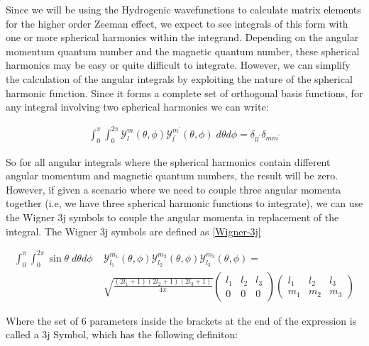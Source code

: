         Since we will be using the Hydrogenic wavefunctions to calculate matrix elements for the higher order Zeeman effect, we expect to see integrals of this form with one or more spherical harmonics within the integrand. Depending on the angular momentum quantum number and the magnetic quantum number, these spherical harmonics may be easy or quite difficult to integrate. However, we can simplify the calculation of the angular integrals by exploiting the nature of the spherical harmonic function. Since it forms a complete set of orthogonal basis functions, for any integral involving two spherical harmonics we can write:

        \begin{align}
            \int_0^\pi \int_0^{2\pi} \mathcal{Y}^m_l(\theta, \phi) \mathcal{Y}^{m^\prime}_{l^\prime} (\theta, \phi) \; d\theta d\phi = \delta_{ll^\prime} \delta_{mm^\prime}
        \end{align}

        So for all angular integrals where the spherical harmonics contain different angular momentum and magnetic quantum numbers, the result will be zero. However, if given a scenario where we need to couple three angular momenta together (i.e, we have three spherical harmonic functions to integrate), we can use the Wigner 3j symbols to couple the angular momenta in replacement of the integral. The Wigner 3j symbols are defined as \ref{Wigner-3j}

        \begin{align}
            \int_0^\pi \int_0^{2\pi} \sin \theta \; d\theta d\phi\;& \mathcal{Y}^{m_1}_{l_1}(\theta, \phi) \mathcal{Y}^{m_2}_{l_2} (\theta, \phi) \mathcal{Y}^{m_3}_{l_3} (\theta, \phi) =\\
             &\sqrt{\frac{(2l_1 + 1)(2l_2 + 1) (2l_3 + 1)}{4 \pi}} \begin{pmatrix}
                l_1 & l_2 & l_3 \\
                0 & 0 & 0
            \end{pmatrix} \begin{pmatrix}
                l_1 & l_2 & l_3 \\
                m_1 & m_2 & m_3 
            \end{pmatrix} \nonumber
        \end{align}

        Where the set of $6$ parameters inside the brackets at the end of the expression is called a $3$j Symbol, which has the following definiton:

